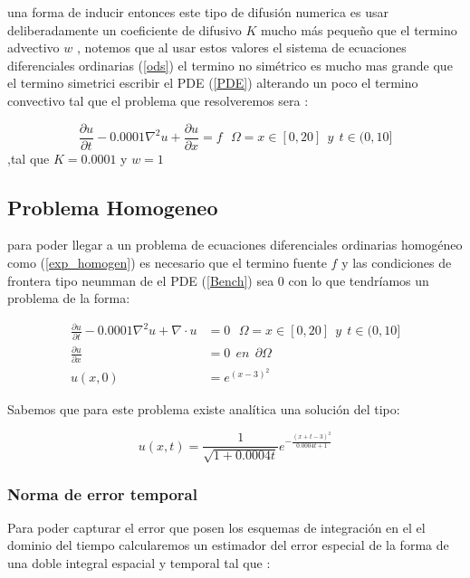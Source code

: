 \documentclass[11pt, spanish]{article}
\begin{document}
una forma de inducir entonces este tipo de difusión numerica es usar deliberadamente un coeficiente de difusivo $K$ mucho más pequeño que el termino advectivo $w$ , notemos que al usar estos valores el sistema de ecuaciones diferenciales ordinarias (\ref{ods}) el termino no simétrico es mucho mas grande que el termino simetrici escribir el PDE (\ref{PDE}) alterando un poco el termino convectivo tal que el problema que resolveremos sera  : 

\begin{equation}
    \frac{\partial u}{\partial t}-0.0001\nabla^2 u +  \frac{\partial u}{\partial x} = f  \ \ \ \Omega = x \in [0,20]  \ \  y \ \ t \in (0,10]
    \label{Bench}
\end{equation}
,tal que $K=0.0001$ y $w=1$

\subsection{Problema Homogeneo}
para poder llegar a un problema de ecuaciones diferenciales ordinarias homog\'eneo como (\ref{exp_homogen}) es necesario que el termino fuente $f$ y las condiciones de frontera tipo neumman de el PDE (\ref{Bench}) sea $0$ con lo que tendr\'iamos un problema de la forma: 

 
\begin{align}
        \frac{\partial u}{\partial t}-0.0001\nabla^2 u + \nabla \cdot  u &= 0  \ \ \ \Omega = x \in [0,20]  \ \  y \ \ t \in (0,10] \\
        \frac{\partial u}{\partial x} &= 0 \ \ en \ \ \partial \Omega \\ 
        u(x,0) &= e^{(x-3)^2}
        \label{Bench}
\end{align}

Sabemos que para este problema existe anal\'itica una soluci\'on del tipo:

\begin{equation}
    u(x,t) =\frac{1}{\sqrt{1+0.0004 t}}e^{- \frac{(x+t-3)^2}{0.0004t+1}}
    \label{ana_ho}
\end{equation}



\subsubsection{ Norma de  error temporal }

Para poder capturar el error que posen los esquemas de integraci\'on en el el dominio del tiempo calcularemos un estimador del error especial de la forma de una doble integral espacial y temporal  tal que : 
\end{document}
